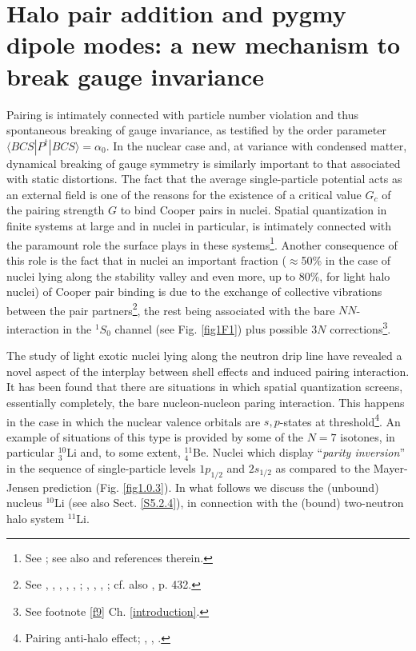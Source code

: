 \section[Halo pair addition mode and pygmy]{Halo pair addition and pygmy dipole modes: a new mechanism to break gauge invariance}\label{App1AF}
Pairing is intimately connected with particle number violation and thus spontaneous breaking of gauge invariance, as testified by the order parameter\\ \mbox{$\langle BCS|P^{\dagger}|BCS\rangle=\alpha_0$}.  In the nuclear case and, at variance with condensed matter, dynamical breaking of gauge symmetry is similarly important to that associated with static distortions. The fact that the average single-particle potential acts as an external field  is one of the reasons for the existence of a critical value $G_c$ of the pairing strength $G$ to bind Cooper pairs in nuclei. Spatial quantization in finite systems at large and in nuclei in particular, is intimately connected with the paramount role the surface plays in these systems\footnote{See \cite{Bohr:75}; see also \cite{Broglia:02d} and references therein.}. Another consequence of this role is  the fact that in nuclei an important fraction ($\approx$50\% in the case of nuclei lying along the stability valley and even more, up to 80\%, for light halo nuclei) of Cooper pair binding is due to the exchange of collective vibrations between the  pair partners\footnote{\label{f53C3} See \cite{Barranco:99}, \cite{Terasaki:02a}, \cite{Brink:05}, \cite{Saperstein:12}, \cite{Avdenkov:12}, \cite{Lombardo:12};  \cite{Barranco:01}, \cite{Potel:10}, \cite{Pankratov:11}, \citet{Barranco:99}; cf. also \cite{Bohr:75}, p. 432.}, the rest being associated with the bare $NN$-interaction in the $^1S_0$ channel (see Fig. \ref{fig1F1}) plus possible $3N$ corrections\footnote{See footnote \ref{f9} Ch. \ref{introduction}.}. 


The study of light exotic nuclei lying along the neutron drip line have revealed a novel aspect of the interplay between shell effects and induced pairing interaction. It has been found  that there are situations in which spatial quantization screens, essentially completely, the bare nucleon-nucleon paring interaction. This happens in the case in which the nuclear valence orbitals are $s,p$-states at threshold\footnote{Pairing anti-halo effect; \cite{Bennaceur:00} 
, \cite{Hamamoto:03}, \cite{Hamamoto:04}.}. An example of situations of this type is provided by some of the $N=7$ isotones, in particular $^{10}_3$Li and, to some extent, $^{11}_4$Be. Nuclei which display ``\textit{parity inversion}'' in the sequence of single-particle levels $1p_{1/2}$ and $2s_{1/2}$ as compared to the Mayer-Jensen prediction (Fig. \ref{fig1.0.3}).
 In what follows we discuss the (unbound) nucleus $^{10}$Li (see also Sect. \ref{S5.2.4}), in connection with the (bound) two-neutron halo system $^{11}$Li.
 
